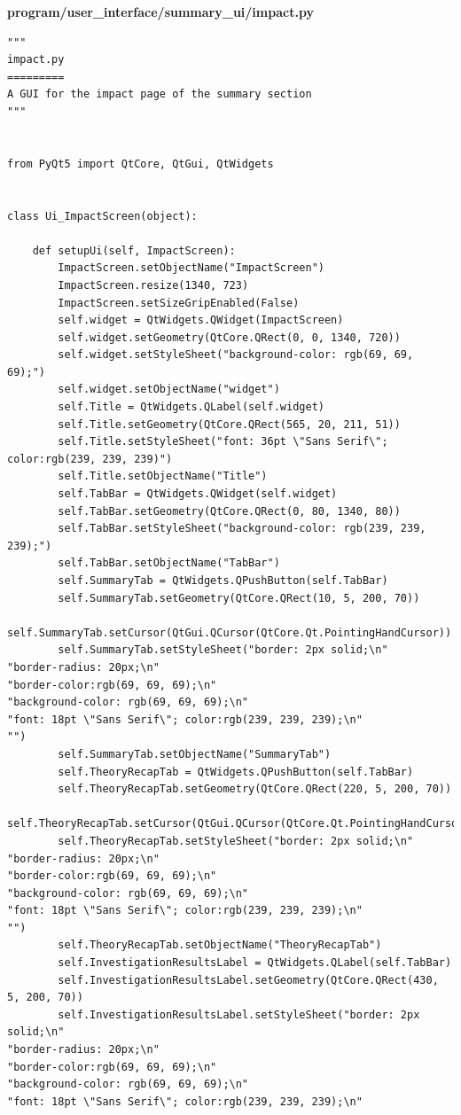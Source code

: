 \documentclass[12pt]{article}
\begin{document}
\textbf{program/user\_interface/summary\_ui/impact.py}
\begin{lstlisting}
"""
impact.py
=========
A GUI for the impact page of the summary section
"""


from PyQt5 import QtCore, QtGui, QtWidgets


class Ui_ImpactScreen(object):

    def setupUi(self, ImpactScreen):
        ImpactScreen.setObjectName("ImpactScreen")
        ImpactScreen.resize(1340, 723)
        ImpactScreen.setSizeGripEnabled(False)
        self.widget = QtWidgets.QWidget(ImpactScreen)
        self.widget.setGeometry(QtCore.QRect(0, 0, 1340, 720))
        self.widget.setStyleSheet("background-color: rgb(69, 69, 69);")
        self.widget.setObjectName("widget")
        self.Title = QtWidgets.QLabel(self.widget)
        self.Title.setGeometry(QtCore.QRect(565, 20, 211, 51))
        self.Title.setStyleSheet("font: 36pt \"Sans Serif\"; color:rgb(239, 239, 239)")
        self.Title.setObjectName("Title")
        self.TabBar = QtWidgets.QWidget(self.widget)
        self.TabBar.setGeometry(QtCore.QRect(0, 80, 1340, 80))
        self.TabBar.setStyleSheet("background-color: rgb(239, 239, 239);")
        self.TabBar.setObjectName("TabBar")
        self.SummaryTab = QtWidgets.QPushButton(self.TabBar)
        self.SummaryTab.setGeometry(QtCore.QRect(10, 5, 200, 70))
        self.SummaryTab.setCursor(QtGui.QCursor(QtCore.Qt.PointingHandCursor))
        self.SummaryTab.setStyleSheet("border: 2px solid;\n"
"border-radius: 20px;\n"
"border-color:rgb(69, 69, 69);\n"
"background-color: rgb(69, 69, 69);\n"
"font: 18pt \"Sans Serif\"; color:rgb(239, 239, 239);\n"
"")
        self.SummaryTab.setObjectName("SummaryTab")
        self.TheoryRecapTab = QtWidgets.QPushButton(self.TabBar)
        self.TheoryRecapTab.setGeometry(QtCore.QRect(220, 5, 200, 70))
        self.TheoryRecapTab.setCursor(QtGui.QCursor(QtCore.Qt.PointingHandCursor))
        self.TheoryRecapTab.setStyleSheet("border: 2px solid;\n"
"border-radius: 20px;\n"
"border-color:rgb(69, 69, 69);\n"
"background-color: rgb(69, 69, 69);\n"
"font: 18pt \"Sans Serif\"; color:rgb(239, 239, 239);\n"
"")
        self.TheoryRecapTab.setObjectName("TheoryRecapTab")
        self.InvestigationResultsLabel = QtWidgets.QLabel(self.TabBar)
        self.InvestigationResultsLabel.setGeometry(QtCore.QRect(430, 5, 200, 70))
        self.InvestigationResultsLabel.setStyleSheet("border: 2px solid;\n"
"border-radius: 20px;\n"
"border-color:rgb(69, 69, 69);\n"
"background-color: rgb(69, 69, 69);\n"
"font: 18pt \"Sans Serif\"; color:rgb(239, 239, 239);\n"

\end{lstlisting}
\end{document}
